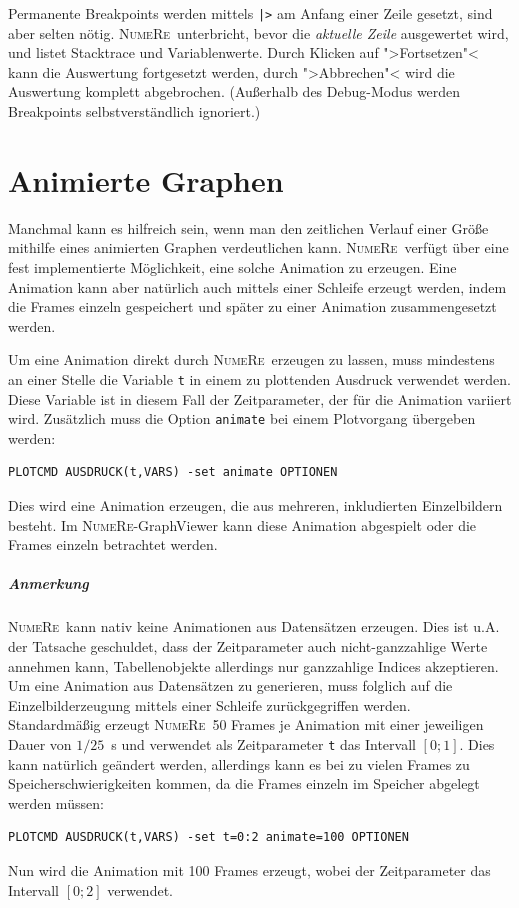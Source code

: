 \documentclass[DIV=14,headsepline,footsepline]{scrbook}
\newcommand{\NR}{\textsc{Nu\-me\-Re}}
\begin{document}
				Permanente Breakpoints werden mittels \lstinline+|>+ am Anfang einer Zeile gesetzt, sind aber selten nötig. \NR\ unterbricht, bevor die \emph{aktuelle Zeile} ausgewertet wird, und listet Stacktrace und Variablenwerte. Durch Klicken auf ">Fortsetzen"< kann die Auswertung fortgesetzt werden, durch ">Abbrechen"< wird die Auswertung komplett abgebrochen. (Außerhalb des Debug-Modus werden Breakpoints selbstverständlich ignoriert.)
				
		\chapter{Animierte Graphen}
			Manchmal kann es hilfreich sein, wenn man den zeitlichen Verlauf einer Größe mithilfe eines animierten Graphen verdeutlichen kann. \NR\ verfügt über eine fest implementierte Möglichkeit, eine solche Animation zu erzeugen. Eine Animation kann aber natürlich auch mittels einer Schleife erzeugt werden, indem die Frames einzeln gespeichert und später zu einer Animation zusammengesetzt werden.
			
			Um eine Animation direkt durch \NR\ erzeugen zu lassen, muss mindestens an einer Stelle die Variable \lstinline+t+ in einem zu plottenden Ausdruck verwendet werden. Diese Variable ist in diesem Fall der Zeitparameter, der für die Animation variiert wird. Zusätzlich muss die Option \lstinline+animate+ bei einem Plotvorgang übergeben werden:
			\begin{lstlisting}
PLOTCMD AUSDRUCK(t,VARS) -set animate OPTIONEN
			\end{lstlisting}
			Dies wird eine Animation erzeugen, die aus mehreren, inkludierten Einzelbildern besteht. Im \NR-GraphViewer kann diese Animation abgespielt oder die Frames einzeln betrachtet werden.
			
			\paragraph{Anmerkung}
				\NR\ kann nativ keine Animationen aus Datensätzen erzeugen. Dies ist u.A. der Tatsache geschuldet, dass der Zeitparameter auch nicht-ganzzahlige Werte annehmen kann, Tabellenobjekte allerdings nur ganzzahlige Indices akzeptieren. Um eine Animation aus Datensätzen zu generieren, muss folglich auf die Einzelbilderzeugung mittels einer Schleife zurückgegriffen werden.\bigskip\\
			Standardmäßig erzeugt \NR\ 50 Frames je Animation mit einer jeweiligen Dauer von $1/25$~s und verwendet als Zeitparameter \lstinline+t+ das Intervall $[0;1]$. Dies kann natürlich geändert werden, allerdings kann es bei zu vielen Frames zu Speicherschwierigkeiten kommen, da die Frames einzeln im Speicher abgelegt werden müssen:
			\begin{lstlisting}
PLOTCMD AUSDRUCK(t,VARS) -set t=0:2 animate=100 OPTIONEN
			\end{lstlisting}
			Nun wird die Animation mit 100 Frames erzeugt, wobei der Zeitparameter das Intervall $[0;2]$ verwendet.
\end{document}
